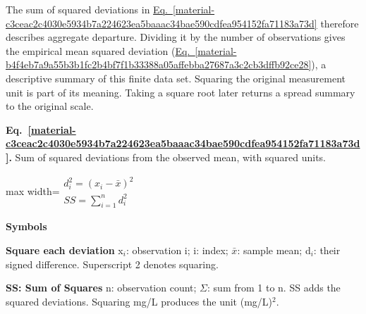 \documentclass[11pt,a4paper]{article}
\begin{document}
The sum of squared deviations in \hyperref[material-c3ceac2c4030e5934b7a224623ea5baaac34bae590cdfea954152fa71183a73d]{Eq.~\ref*{material-c3ceac2c4030e5934b7a224623ea5baaac34bae590cdfea954152fa71183a73d}} therefore describes aggregate departure. Dividing it by the number of observations gives the empirical mean squared deviation (\hyperref[material-b4f4eb7a9a55b3b1fc2b4bf7f1b33388a05affebba27687a3c2cb3dffb92ce28]{Eq.~\ref*{material-b4f4eb7a9a55b3b1fc2b4bf7f1b33388a05affebba27687a3c2cb3dffb92ce28}}), a descriptive summary of this finite data set. Squaring the original measurement unit is part of its meaning. Taking a square root later returns a spread summary to the original scale.


\par\medskip
\noindent\begin{minipage}{\linewidth}
\label{material-c3ceac2c4030e5934b7a224623ea5baaac34bae590cdfea954152fa71183a73d}
\noindent\textbf{Eq.~\ref*{material-c3ceac2c4030e5934b7a224623ea5baaac34bae590cdfea954152fa71183a73d}.} Sum of squared deviations from the observed mean, with squared units.\par\nopagebreak
\begin{center}\begin{adjustbox}{max width=\linewidth}$\displaystyle \begin{gathered}d_i^2=(x_i-\bar{x})^2\\SS=\sum_{i=1}^{n}d_i^2\end{gathered}$\end{adjustbox}\end{center}

\par\noindent\textbf{Symbols}

\par\noindent\textbf{Square each deviation} x\ensuremath{{}_i}: observation i; i: index; \ensuremath{\bar{x}}: sample mean; d\ensuremath{{}_i}: their signed difference. Superscript 2 denotes squaring.

\par\noindent\textbf{SS: Sum of Squares} n: observation count; \ensuremath{\Sigma}: sum from 1 to n. SS adds the squared deviations. Squaring mg/L produces the unit (mg/L)\ensuremath{{}^2}.

\end{minipage}\par
\medskip
\end{document}
